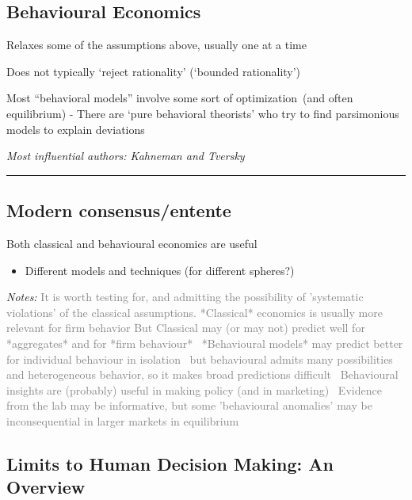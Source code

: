 \documentclass[]{article}
\providecommand{\tightlist}{%
  \setlength{\itemsep}{0pt}\setlength{\parskip}{0pt}}
\begin{document}
\hypertarget{behavioural-economics}{%
\subsection{Behavioural Economics}\label{behavioural-economics}}

Relaxes some of the assumptions above, usually one at a time

\bigskip

Does not typically `reject rationality' (`bounded rationality')

\bigskip

Most ``behavioral models'' involve some sort of optimization~(and often equilibrium)
- There are `pure behavioral theorists' who try to find parsimonious models to explain deviations

\emph{Most influential authors: Kahneman and Tversky}

\begin{center}\rule{0.5\linewidth}{\linethickness}\end{center}

\hypertarget{modern-consensusentente}{%
\subsection{Modern consensus/entente}\label{modern-consensusentente}}

Both classical and behavioural economics are useful

\begin{itemize}
\tightlist
\item
  Different models and techniques (for different spheres?)
\end{itemize}

\emph{Notes:} \textcolor{gray}{It is worth testing for, and admitting the possibility of 'systematic violations' of the classical assumptions.
*Classical* economics is usually more relevant for firm behavior
But Classical may (or may not) predict well for *aggregates* and for *firm behaviour* \
*Behavioural models* may predict better for individual behaviour in isolation \
but behavioural admits many possibilities and heterogeneous behavior, so it makes broad predictions difficult \
Behavioural insights are (probably) useful in making policy (and in marketing) \
Evidence from the lab may be informative, but some 'behavioural anomalies' may be inconsequential in larger markets in equilibrium}

\hypertarget{limits-to-human-decision-making-an-overview}{%
\subsection{Limits to Human Decision Making: An Overview}\label{limits-to-human-decision-making-an-overview}}
\end{document}

